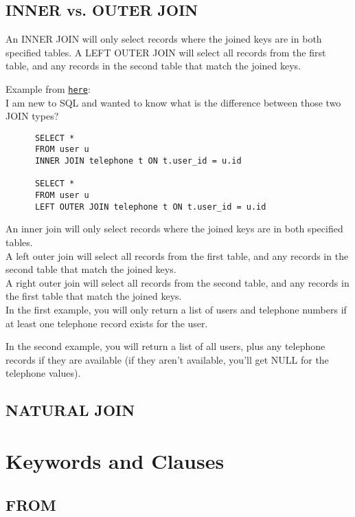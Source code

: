 \documentclass[11pt,a4paper]{article}
\begin{document}
    \subsection{INNER vs. OUTER JOIN}
    An INNER JOIN will only select records where the joined keys are in
    both specified tables. A LEFT OUTER JOIN will select all records from
    the first table, and any records in the second table that match the
    joined keys.
    
    Example from \href{http://dba.stackexchange.com/questions/153/what-is-the-difference-between-an-inner-join-and-an-outer-join}{\tt here}: \\
    I am new to SQL and wanted to know what is the difference between those two JOIN types?
    \begin{lstlisting}
      SELECT * 
      FROM user u
      INNER JOIN telephone t ON t.user_id = u.id

      SELECT * 
      FROM user u
      LEFT OUTER JOIN telephone t ON t.user_id = u.id    
   \end{lstlisting}
   An inner join will only select records where the joined keys are in both specified tables.\\
   A left outer join will select all records from the first table, and any records in the second table that match the joined keys.\\
   A right outer join will select all records from the second table, and any records in the first table that match the joined keys.\\
   
   In the first example, you will only return a list of users and telephone numbers if at least one telephone record exists for the user.
   
   In the second example, you will return a list of all users, plus any telephone records if they are available (if they aren't available, you'll get NULL for the telephone values).
   

    
    \subsection{NATURAL JOIN}


\newpage
\section{Keywords and Clauses}

    \subsection*{FROM}
\end{document}

